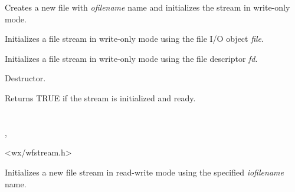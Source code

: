 Creates a new file with {\it ofilename} name and initializes the stream in
write-only mode. 


Initializes a file stream in write-only mode using the file I/O object {\it file}.


Initializes a file stream in write-only mode using the file descriptor {\it fd}.



Destructor.



Returns TRUE if the stream is initialized and ready.

\section{}


, 


<wx/wfstream.h>






Initializes a new file stream in read-write mode using the specified 
{\it iofilename} name.


\section{}\label{wxffileinputstream}

